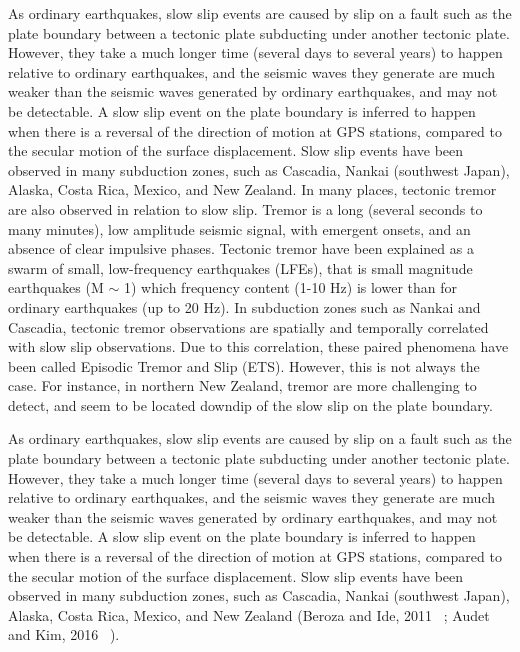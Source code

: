 \documentclass[letterpaper, 12pt]{article}
\begin{document}
As ordinary earthquakes, slow slip events are caused by slip on a fault such as the plate boundary between a tectonic plate subducting under another tectonic plate. However, they take a much longer time (several days to several years) to happen relative to ordinary earthquakes, and the seismic waves they generate are much weaker than the seismic waves generated by ordinary earthquakes, and may not be detectable. A slow slip event on the plate boundary is inferred to happen when there is a reversal of the direction of motion at GPS stations, compared to the secular motion of the surface displacement. Slow slip events have been observed in many subduction zones, such as Cascadia, Nankai (southwest Japan), Alaska, Costa Rica, Mexico, and New Zealand. In many places, tectonic tremor are also observed in relation to slow slip. Tremor is a long (several seconds to many minutes), low amplitude seismic signal, with emergent onsets, and an absence of clear impulsive phases. Tectonic tremor have been explained as a swarm of small, low-frequency earthquakes (LFEs), that is small magnitude earthquakes (M $\sim$ 1) which frequency content (1-10 Hz) is lower than for ordinary earthquakes (up to 20 Hz). In subduction zones such as Nankai and Cascadia, tectonic tremor observations are spatially and temporally correlated with slow slip observations. Due to this correlation, these paired phenomena have been called Episodic Tremor and Slip (ETS). However, this is not always the case. For instance, in northern New Zealand, tremor are more challenging to detect, and seem to be located downdip of the slow slip on the plate boundary.

As ordinary earthquakes, slow slip events are caused by slip on a fault such as the plate boundary between a tectonic plate subducting under another tectonic plate. However, they take a much longer time (several days to several years) to happen relative to ordinary earthquakes, and the seismic waves they generate are much weaker than the seismic waves generated by ordinary earthquakes, and may not be detectable.  A slow slip event on the plate boundary is inferred to happen when there is a reversal of the direction of motion at GPS stations, compared to the secular motion of the surface displacement. Slow slip events have been observed in many subduction zones, such as Cascadia, Nankai (southwest Japan), Alaska, Costa Rica, Mexico, and New Zealand (Beroza and Ide, 2011 ~\cite{BER_2011}; Audet and Kim, 2016 ~\cite{AUD_2016}).
\end{document}
